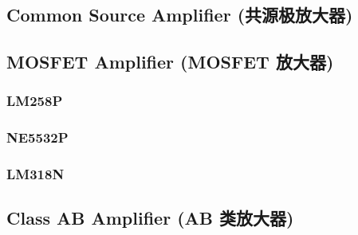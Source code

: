 \documentclass[UTF8]{report}
\begin{document}
\section{Common Source Amplifier (共源极放大器)}
\section{MOSFET Amplifier (MOSFET 放大器)}

\subsection{LM258P}
\subsection{NE5532P}
\subsection{LM318N}

\section{Class AB Amplifier (AB 类放大器)}

\chapter{}\thispagestyle{fancy}
\end{document}
